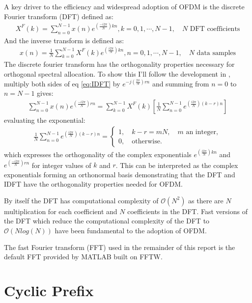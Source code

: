 A key driver to the efficiency and widespread adoption %
of OFDM is the discrete Fourier transform (DFT) defined %
as\cite{Rao2010}:
\begin{align}
	X^F(k) = \sum_{n=0}^{N-1}x(n)e^{(\frac{-i 2\pi}{N})kn}, %
	k=0,1,\cdots,N-1,\quad N \text{ DFT coefficients}
\end{align}
And the inverse transform is defined as:
\begin{align}
	x(n) = \frac{1}{N}\sum_{k=0}^{N-1}X^{F}(k)%
	e^{(\frac{i 2\pi}{N})kn}, n = 0,1,\cdots,N-1, \quad%
	N \text{ data samples}
	\label{eq:IDFT}
\end{align}
The discrete fourier transform has the orthogonality %
properties necessary for orthogonal spectral allocation. %
To show this I'll follow the development in \cite{Opp99}, %
multiply both sides of eq \ref{eq:IDFT} by %
$e^{-j(\frac{2\pi}{N})rn}$ and summing from $n=0$ %
to $n=N-1$ gives:
\begin{align}
	\sum_{n=0}^{N-1}x(n)e^{(\frac{-i 2\pi}{N})rn} = %
	\sum_{k=0}^{N-1}X^{F}(k)\left[\frac{1}{N} \sum_{n=0}^{N-1} %
	e^{(\frac{i 2\pi}{N})(k-r)n}\right]
\end{align}
evaluating the exponential:
\begin{align}
	\frac{1}{N}\sum_{n=0}^{N-1}e^{(\frac{i 2\pi}{N})(k-r)n}%
	= \begin{cases}
		1,\quad k-r = mN, \quad m\text{ an integer},\\
		0,\quad \text{otherwise.}
	\end{cases}
\end{align}
which expresses the orthogonality of the complex exponentials %
$e^{(\frac{i 2\pi}{N})kn}$ and $e^{(\frac{-i 2\pi}{N})rn}$ for %
integer values of $k$ and $r$. This can be interpreted as the %
complex exponentials forming an orthonormal basis demonstrating %
that %
the DFT and IDFT have the orthogonality properties needed for %
OFDM.

By itself the DFT has computational complexity of $\mathcal{O}(%
N^2)$ as there are $N$ multiplication for each coefficient and %
$N$ coefficients in the DFT. Fast versions of the DFT which %
reduce the computational complexity of the DFT to $\mathcal{O}(%
Nlog(N))$ have been fundamental to the adoption of OFDM.%

The fast Fourier transform (FFT) used in the remainder of %
this report %
is the default FFT provided by MATLAB built on FFTW\cite{FFTW}. %
\section{Cyclic Prefix}

